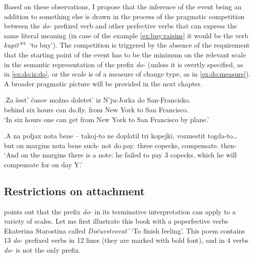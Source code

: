 Based on these observations, I propose that the inference of the event being an addition to something else is drawn in the process of the pragmatic competition between the \textit{do-}  prefixed verb and other perfective verbs  that can express the same literal meaning (in case of the example \ref{ex:buy:raisins} it would be the verb \textit{kupit'$^{\textsc{pf}}$} `to buy'). The competition is triggered by the absence of the requirement that the starting point of the event has to be the minimum on the relevant scale in the semantic representation of the prefix \textit{do-}   (unless it is overtly specified, as in \ref{ex:do:iz:do}, or the scale is of a measure of change type, as in \ref{ex:do:measure}). A broader pragmatic picture will be provided in the next chapter.

\exg.\label{ex:do:iz:do}Za \v{s}est' \v{c}asov mo\v{z}no doletet' iz N'ju-Jorka do San-Francisko.\\
behind six hours can do.fly. from {New York} to {San Francisco}.\\
\trans `In six hours one can get from New York to San Francisco by plane.'\\

\exg.\label{ex:do:measure}A na poljax nota bene -- takoj-to ne doplatil tri kopejki, vozmestit togda-to…\\
but on margins nota bene {} such- not do.pay. three copecks, compensate. then-\\
\trans `And on the margins there is a note: he failed to pay 3 copecks, which he will compensate for on day Y.'

\subsection{Restrictions on attachment}
\citet[236]{Kagan:12} points out that the prefix \textit{do-}   in its terminative  interpretation can apply to a variety of scales. Let me first illustrate this book with a poperfective verbs Ekaterina Starostina called \textit{Do\v{c}uvstvovat'} `To finish feeling'. This poem contains 13 \textit{do-}  prefixed verbs in 12 lines (they are marked with bold font), and in 4 verbs \textit{do-}   is not the only prefix.

